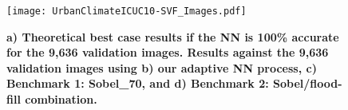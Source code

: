 \documentclass[final,3p,times,authoryear]{elsarticle}
\begin{document}



\begin{figure}
\centering
\texttt{[image: UrbanClimateICUC10-SVF\_Images.pdf]} 
\caption{\textbf{a) Theoretical best case results if the NN is 100\% accurate for the 9,636 validation images. Results against the 9,636 validation images using b) our adaptive NN process, c) Benchmark 1: Sobel\_70, and d) Benchmark 2: Sobel/flood-fill combination.}}
\label{fig:errorfloodall}
\end{figure}
\end{document}
